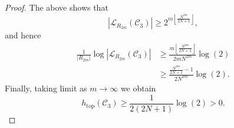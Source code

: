 \documentclass[letterpaper,10pt]{article}
\theoremstyle{plain}
\def\htop{h_{\mathrm{top}}}
\begin{document}
\begin{proof}



The above shows that
$$
|\mathcal{L}_{R_{2m}}(\mathcal{C}_3)|\ge 2^{m\left\lfloor \frac{N^{2m}}{2N+1}\right\rfloor },
$$
and hence
\begin{align*}
\frac{1}{|R_{2m}|}\log |\mathcal{L}_{R_{2m}}(\mathcal{C}_3)|&\ge\frac{m\left\lfloor \frac{N^{2m}}{2N+1}\right\rfloor}{2mN^{2m}}\log(2) \\
&\ge \frac{\frac{N^{2m}}{2N+1}-1}{2N^{2m}}\log(2).
\end{align*}
Finally, taking limit as $m\to\infty$ we obtain
$$
\htop(\mathcal{C}_3)\ge \frac{1}{2(2N+1)}\log(2)>0.
$$
\end{proof}
	
\end{document}
